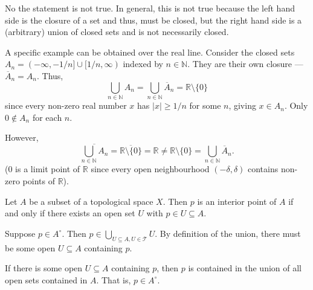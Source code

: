 \documentclass[12 pt, letterpaper]{hmcpset}
\begin{document}
\begin{solution}
	No the statement is not true. In general, this is not true because the left hand side is the closure of a set and thus, must be closed, but the right hand side is a (arbitrary) union of closed sets and is not necessarily closed.

	A specific example can be obtained over the real line. Consider the closed sets $A_{n} = (-\infty, -1/n] \cup [1/n, \infty)$ indexed by $n \in \mathbb{N}$. They are their own closure --- $\overline{A}_{n} = A_{n}$. Thus,
	\[
		\bigcup_{n \in \mathbb{N}} A_{n} = \bigcup_{n \in \mathbb{N}} \overline{A}_{n} = \mathbb{R} \setminus \{ 0 \}
	\]
	since every non-zero real number $x$ has $\lvert x \rvert \ge 1/n$ for some $n$, giving $x \in A_{n}$. Only $0 \notin A_{n}$ for each $n$.

	However,
	\[
		\overline{\bigcup_{n \in \mathbb{N}} A_{n}} = \overline{\mathbb{R} \setminus \{ 0 \}} = \mathbb{R} \neq \mathbb{R} \setminus \{ 0 \} = \bigcup_{n \in \mathbb{N}} \overline{A}_{n}.
	\]
	($0$ is a limit point of $\mathbb{R}$ since every open neighbourhood $(-\delta, \delta)$ contains non-zero points of $\mathbb{R}$).
\end{solution}

\pagebreak

\begin{problem}[2.26]
	Let $A$ be a subset of a topological space $X$. Then $p$ is an interior point of $A$ if and only if there exists an open set $U$ with $p \in U \subseteq A$.
\end{problem}

\begin{solution}
	Suppose $p \in A^{\circ}$. Then $p \in \bigcup_{U \subseteq A, U \in \mathcal{T}} U$. By definition of the union, there must be some open $U \subseteq A$ containing $p$.

	If there is some open $U \subseteq A$ containing $p$, then $p$ is contained in the union of all open sets contained in $A$. That is, $p \in A^{\circ}$.
\end{solution}
\end{document}
